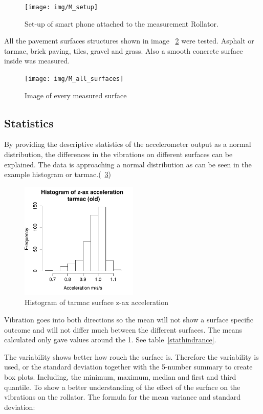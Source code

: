 \begin{figure}[h]
\texttt{[image: img/M\_setup]}
\centering
\caption{ Set-up of smart phone attached to the measurement Rollator. \label{setup2}}
\end{figure}

All the pavement surfaces structures shown in image ~\ref{surfaceimg} were tested. Asphalt or tarmac, brick paving, tiles, gravel and grass. Also a smooth concrete surface inside was measured. 

\begin{figure}[h]
\texttt{[image: img/M\_all\_surfaces]}
\centering
\caption{Image of every measured surface \label{surfaceimg}}
\end{figure}
\clearpage

\subsection{Statistics}
By providing the descriptive statistics of the accelerometer output as a normal distribution, the differences in the vibrations on different surfaces can be explained. The data is approaching a normal distribution as can be seen in the example histogram or tarmac.(~\ref{hist})
\begin{figure}[!h]
\includegraphics[width=0.5\textwidth]{img/M_hist_tarmac_old.pdf}
\centering
\caption{Histogram of tarmac surface z-ax acceleration \label{hist}}
\end{figure}

Vibration goes into both directions so the mean will not show a surface specific outcome and will not differ much between the different surfaces. The means calculated only gave values around the 1. See table~\ref{stathindrance}.

The variability shows better how rouch the surface is. Therefore the variability is used, or the standard deviation together with the 5-number summary to create box plots. Including, the minimum, maximum, median and first and third quantile. To show a better understanding of the effect of the surface on the vibrations on the rollator. The formula for the mean variance and standard deviation:

